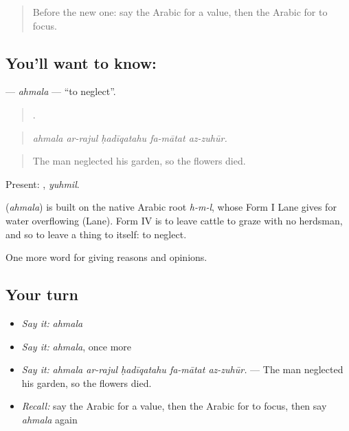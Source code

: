 \label{lesson:AR-C368-ahmala}



\begin{quote}
Before the new one: say the Arabic for a value, then the Arabic for to focus.
\end{quote}

\subsection*{You'll want to know: }
\textbf{} — \emph{ahmala} — \textquotedblleft{}to neglect\textquotedblright{}.

\begin{quote}
    .
\end{quote}

\begin{quote}
\emph{ahmala ar-rajul ḥadīqatahu fa-mātat az-zuhūr.}
\end{quote}

\begin{quote}
The man neglected his garden, so the flowers died.
\end{quote}

Present: , \emph{yuhmil}.

\begin{cousinweb}
\textbf{} (\emph{ahmala}) is built on the native Arabic root \emph{h-m-l}, whose Form I Lane gives for water overflowing (Lane). Form IV is to leave cattle to graze with no herdsman, and so to leave a thing to itself: to neglect.
\end{cousinweb}

\begin{grammarlens}[title={What you've built}]
One more word for giving reasons and opinions.
\end{grammarlens}

\subsection*{Your turn}
\begin{itemize}
\raggedright
  \item \emph{Say it:} \emph{ahmala}
  \item \emph{Say it:} \emph{ahmala}, once more
  \item \emph{Say it:} \emph{ahmala ar-rajul ḥadīqatahu fa-mātat az-zuhūr.} — The man neglected his garden, so the flowers died.
  \item \emph{Recall:} say the Arabic for a value, then the Arabic for to focus, then say \emph{ahmala} again
\end{itemize}

